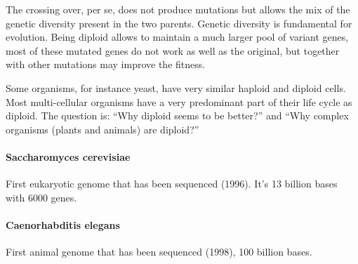 The crossing over, per se, does not produce mutations
but allows the mix of the genetic diversity present in the two parents. Genetic
diversity is fundamental for evolution. Being diploid allows to maintain a much
larger pool of variant genes, most of these mutated genes do not work as well
as the original, but together with other mutations may improve the fitness.

Some organisms, for instance yeast, have very similar haploid and diploid
cells. Most multi-cellular organisms have a very predominant part of their life
cycle as diploid. The question is: ``Why diploid seems to be better?'' and ``Why
complex organisms (plants and animals) are diploid?''

\paragraph*{Saccharomyces cerevisiae}
First eukaryotic genome that has been sequenced (1996). It's 13 billion bases
with 6000 genes.

\paragraph*{Caenorhabditis elegans}
First animal genome that has been sequenced (1998), 100 billion bases.

